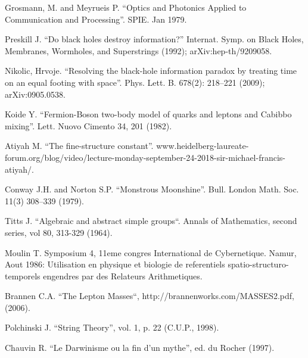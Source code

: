 \documentclass[twoside,draft]{article}
\begin{document}
\begin{sloppypar}
\begin{thebibliography}{99}
 Grosmann, M. and Meyrueis P. ``Optics and Photonics Applied to Communication and Processing''. SPIE.  Jan 1979.

 Preskill J. ``Do black holes destroy information?'' Internat.
Symp. on Black Holes, Membranes, Wormholes, and Superstrings (1992);
arXiv:hep-th/9209058.

 Nikolic, Hrvoje. ``Resolving the black-hole information paradox by
treating time on an equal footing with space''. Phys. Lett. B. 678(2):
218--221 (2009); arXiv:0905.0538.

 Koide Y. ``Fermion-Boson two-body model of quarks and leptons and
Cabibbo mixing''.  Lett. Nuovo Cimento 34, 201 (1982).

 Atiyah M. ``The fine-structure constant''. www.heidelberg-laureate-forum.org/blog/video/lecture-monday-september-24-2018-sir-michael-francis-atiyah/.

 Conway J.H. and Norton S.P. ``Monstrous Moonshine''. Bull. London
Math. Soc. 11(3) 308--339 (1979).

 Titts J. ``Algebraic and abstract simple groups``. Annals of Mathematics, second series, vol 80, 313-329 (1964).



 Moulin T. Symposium 4, 11eme congres International de Cybernetique. Namur, Aout 1986: Utilisation en physique et biologie de referentiels spatio-structuro-temporels engendres par des Relateurs Arithmetiques. 

 Brannen C.A. ``The Lepton Masses``, http://brannenworks.com/MASSES2.pdf, (2006).

 Polchinski J. ``String Theory'', vol. 1, p. 22 (C.U.P., 1998).

 Chauvin R. ``Le Darwinisme ou la fin d'un mythe'', ed. du Rocher
(1997).


\end{thebibliography}
\end{sloppypar}
\end{document}
